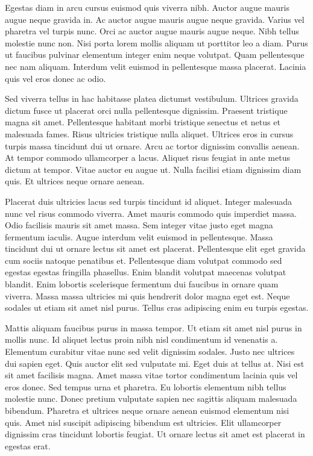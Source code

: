 \documentclass[11pt,a4paper]{article}
\begin{document}
Egestas diam in arcu cursus euismod quis viverra nibh. Auctor augue mauris augue neque gravida in. Ac auctor augue mauris augue neque gravida. Varius vel pharetra vel turpis nunc. Orci ac auctor augue mauris augue neque. Nibh tellus molestie nunc non. Nisi porta lorem mollis aliquam ut porttitor leo a diam. Purus ut faucibus pulvinar elementum integer enim neque volutpat. Quam pellentesque nec nam aliquam. Interdum velit euismod in pellentesque massa placerat. Lacinia quis vel eros donec ac odio.

Sed viverra tellus in hac habitasse platea dictumst vestibulum. Ultrices gravida dictum fusce ut placerat orci nulla pellentesque dignissim. Praesent tristique magna sit amet. Pellentesque habitant morbi tristique senectus et netus et malesuada fames. Risus ultricies tristique nulla aliquet. Ultrices eros in cursus turpis massa tincidunt dui ut ornare. Arcu ac tortor dignissim convallis aenean. At tempor commodo ullamcorper a lacus. Aliquet risus feugiat in ante metus dictum at tempor. Vitae auctor eu augue ut. Nulla facilisi etiam dignissim diam quis. Et ultrices neque ornare aenean.

Placerat duis ultricies lacus sed turpis tincidunt id aliquet. Integer malesuada nunc vel risus commodo viverra. Amet mauris commodo quis imperdiet massa. Odio facilisis mauris sit amet massa. Sem integer vitae justo eget magna fermentum iaculis. Augue interdum velit euismod in pellentesque. Massa tincidunt dui ut ornare lectus sit amet est placerat. Pellentesque elit eget gravida cum sociis natoque penatibus et. Pellentesque diam volutpat commodo sed egestas egestas fringilla phasellus. Enim blandit volutpat maecenas volutpat blandit. Enim lobortis scelerisque fermentum dui faucibus in ornare quam viverra. Massa massa ultricies mi quis hendrerit dolor magna eget est. Neque sodales ut etiam sit amet nisl purus. Tellus cras adipiscing enim eu turpis egestas.

Mattis aliquam faucibus purus in massa tempor. Ut etiam sit amet nisl purus in mollis nunc. Id aliquet lectus proin nibh nisl condimentum id venenatis a. Elementum curabitur vitae nunc sed velit dignissim sodales. Justo nec ultrices dui sapien eget. Quis auctor elit sed vulputate mi. Eget duis at tellus at. Nisi est sit amet facilisis magna. Amet massa vitae tortor condimentum lacinia quis vel eros donec. Sed tempus urna et pharetra. Eu lobortis elementum nibh tellus molestie nunc. Donec pretium vulputate sapien nec sagittis aliquam malesuada bibendum. Pharetra et ultrices neque ornare aenean euismod elementum nisi quis. Amet nisl suscipit adipiscing bibendum est ultricies. Elit ullamcorper dignissim cras tincidunt lobortis feugiat. Ut ornare lectus sit amet est placerat in egestas erat.
\end{document}
